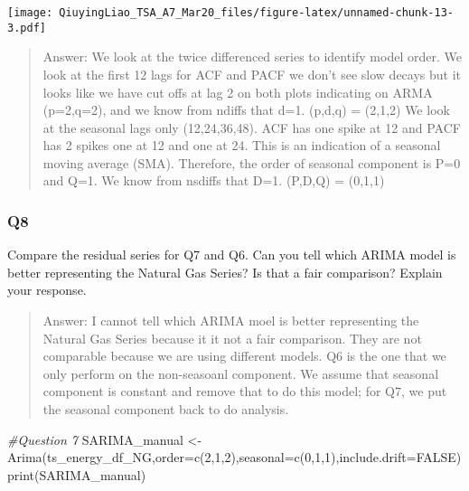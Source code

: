 \documentclass[
]{article}
\newenvironment{Shaded}{\begin{snugshade}}{\end{snugshade}}
\newcommand{\AttributeTok}[1]{\textcolor[rgb]{0.77,0.63,0.00}{#1}}
\newcommand{\CommentTok}[1]{\textcolor[rgb]{0.56,0.35,0.01}{\textit{#1}}}
\newcommand{\ConstantTok}[1]{\textcolor[rgb]{0.00,0.00,0.00}{#1}}
\newcommand{\DecValTok}[1]{\textcolor[rgb]{0.00,0.00,0.81}{#1}}
\newcommand{\FunctionTok}[1]{\textcolor[rgb]{0.00,0.00,0.00}{#1}}
\newcommand{\NormalTok}[1]{#1}
\newcommand{\OtherTok}[1]{\textcolor[rgb]{0.56,0.35,0.01}{#1}}
\begin{document}
\texttt{[image: QiuyingLiao\_TSA\_A7\_Mar20\_files/figure-latex/unnamed-chunk-13-3.pdf]}

\begin{quote}
Answer: We look at the twice differenced series to identify model order.
We look at the first 12 lags for ACF and PACF we don't see slow decays
but it looks like we have cut offs at lag 2 on both plots indicating on
ARMA (p=2,q=2), and we know from ndiffs that d=1. (p,d,q) = (2,1,2) We
look at the seasonal lags only (12,24,36,48). ACF has one spike at 12
and PACF has 2 spikes one at 12 and one at 24. This is an indication of
a seasonal moving average (SMA). Therefore, the order of seasonal
component is P=0 and Q=1. We know from nsdiffs that D=1. (P,D,Q) =
(0,1,1)
\end{quote}

\hypertarget{q8}{%
\subsubsection{Q8}\label{q8}}

Compare the residual series for Q7 and Q6. Can you tell which ARIMA
model is better representing the Natural Gas Series? Is that a fair
comparison? Explain your response.

\begin{quote}
Answer: I cannot tell which ARIMA moel is better representing the
Natural Gas Series because it it not a fair comparison. They are not
comparable because we are using different models. Q6 is the one that we
only perform on the non-seasoanl component. We assume that seasonal
component is constant and remove that to do this model; for Q7, we put
the seasonal component back to do analysis.
\end{quote}

\begin{Shaded}
\begin{Highlighting}[]
\CommentTok{\#Question 7}
\NormalTok{SARIMA\_manual }\OtherTok{\textless{}{-}} \FunctionTok{Arima}\NormalTok{(ts\_energy\_df\_NG,}\AttributeTok{order=}\FunctionTok{c}\NormalTok{(}\DecValTok{2}\NormalTok{,}\DecValTok{1}\NormalTok{,}\DecValTok{2}\NormalTok{),}\AttributeTok{seasonal=}\FunctionTok{c}\NormalTok{(}\DecValTok{0}\NormalTok{,}\DecValTok{1}\NormalTok{,}\DecValTok{1}\NormalTok{),}\AttributeTok{include.drift=}\ConstantTok{FALSE}\NormalTok{) }
\FunctionTok{print}\NormalTok{(SARIMA\_manual)}
\end{Highlighting}
\end{Shaded}
\end{document}
